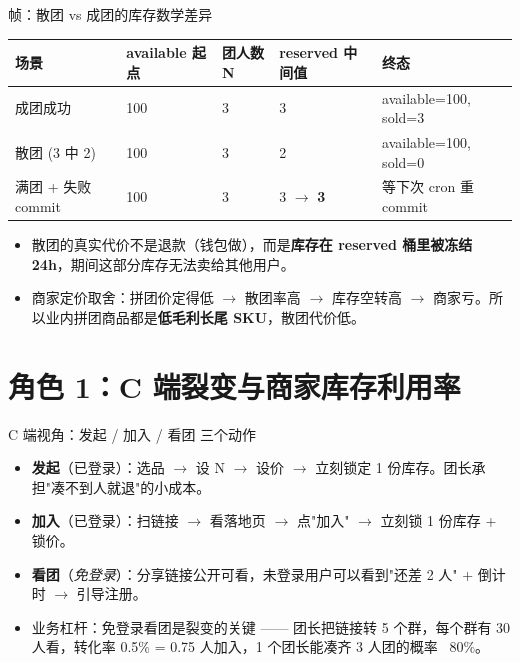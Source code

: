\documentclass[aspectratio=169,11pt]{beamer}
\begin{document}
\begin{frame}[shrink]{帧：散团 vs 成团的库存数学差异}
\begin{tabular}{@{}lllll@{}}
\toprule
场景    & available 起点 & 团人数 N & reserved 中间值 & 终态 \\
\midrule
成团成功 & 100             & 3        & 3               & available=100, sold=3 \\
散团 (3 中 2)  & 100      & 3        & 2               & available=100, sold=0 \\
满团 + 失败 commit & 100  & 3        & 3 $\to$ \textbf{3} & 等下次 cron 重 commit \\
\bottomrule
\end{tabular}
\vspace{2mm}
\begin{itemize}
  \item 散团的真实代价不是退款（钱包做），而是\textbf{库存在 reserved 桶里被冻结 24h}，期间这部分库存无法卖给其他用户。
  \item 商家定价取舍：拼团价定得低 $\to$ 散团率高 $\to$ 库存空转高 $\to$ 商家亏。所以业内拼团商品都是\textbf{低毛利长尾 SKU}，散团代价低。
\end{itemize}
\end{frame}

\section{角色 1：C 端裂变与商家库存利用率}

\begin{frame}[shrink]{C 端视角：发起 / 加入 / 看团 三个动作}
\begin{itemize}
  \item \textbf{发起}（已登录）：选品 $\to$ 设 N $\to$ 设价 $\to$ 立刻锁定 1 份库存。团长承担"凑不到人就退"的小成本。
  \item \textbf{加入}（已登录）：扫链接 $\to$ 看落地页 $\to$ 点"加入" $\to$ 立刻锁 1 份库存 + 锁价。
  \item \textbf{看团}（\emph{免登录}）：分享链接公开可看，未登录用户可以看到"还差 2 人" + 倒计时 $\to$ 引导注册。
  \item 业务杠杆：免登录看团是裂变的关键 —— 团长把链接转 5 个群，每个群有 30 人看，转化率 0.5\% = 0.75 人加入，1 个团长能凑齐 3 人团的概率 ~80\%。
\end{itemize}
\end{frame}
\end{document}
